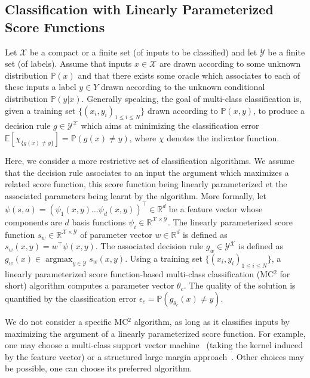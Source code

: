 \documentclass[english,utf8]{./hermes-journal}
\newcommand{\argmax}{\operatorname*{argmax}} %
\newcommand{\X}{\mathcal{X}}
\newcommand{\Y}{\mathcal{Y}}
\newcommand{\E}{\mathbb{E}}
\newcommand{\prob}{\mathbb{P}}
\begin{document}
\subsection{Classification with Linearly Parameterized Score
Functions} \label{subsec:background:classif}

Let $\X$ be a compact or a finite set (of inputs to be classified)
and let $\Y$ be a finite set (of labels). Assume that inputs $x\in
\X$  are drawn according to some unknown distribution $\prob(x)$ and
that there exists some oracle which associates to each of these
inputs a label $y\in Y$ drawn according to the unknown conditional
distribution $\prob(y|x)$. Generally speaking, the goal of
multi-class classification is, given a training set
$\{(x_i,y_i)_{1\leq i \leq N}\}$ drawn according to $\prob(x,y)$, to
produce a decision rule $g\in\Y^\X$ which aims at minimizing the
classification error $\E[\chi_{\{g(x)\neq y\}}] = \prob(g(x)\neq
y)$, where $\chi$ denotes the indicator function.

Here, we consider a more restrictive set of classification
algorithms. We assume that the decision rule associates to an input
the argument which maximizes a related score function, this score
function being linearly parameterized et the associated parameters
being learnt by the algorithm. More formally, let $\psi(s,a) =
(\psi_1(x,y)  \dots  \psi_d(x,y))^\top\in \mathbb{R}^d$
be a feature vector whose components are $d$ basis functions
$\psi_i\in\mathbb{R}^{\X\times\Y}$. The linearly parameterized score
function $s_w\in\mathbb{R}^{\X\times \Y}$ of parameter vector
$w\in\mathbb{R}^d$ is defined as $s_w(x,y) = w^\top \psi(x,y)$. The
associated decision rule $g_w\in{\Y^\X}$ is defined as $g_w(x) \in
\argmax_{y\in\Y}s_w(x,y)$. Using a training set $\{(x_i,y_i)_{1\leq
i\leq N}\}$, a linearly parameterized score function-based
multi-class classification (MC$^2$ for short) algorithm computes a
parameter vector $\theta_c$. The quality of the solution is
quantified by the classification error $\epsilon_c =
\prob(g_{\theta_c}(x)\neq y)$.

We do not consider a specific MC$^2$ algorithm, as long as it
classifies inputs by maximizing the argument of a linearly
parameterized score function. For example, one may choose a
multi-class support vector machine~\cite{Guermeur:2007} (taking the
kernel induced by the feature vector) or a structured large margin
approach~\cite{Taskar:2005}. Other choices may be possible, one can
choose its preferred algorithm.
\end{document}
